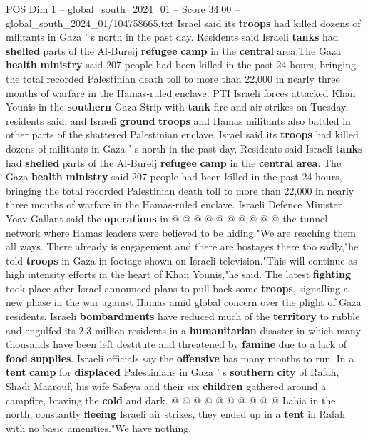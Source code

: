 \begin{textsample}{POS Dim 1 – global\_south\_2024\_01 – Score 34.00 – global\_south\_2024\_01/104758665.txt}  \label{ex:f1_pos_117}
Israel said its \textbf{troops} had killed dozens of militants in Gaza ' s north in the past day.
Residents said Israeli \textbf{tanks} had \textbf{shelled} parts of the Al-Bureij \textbf{refugee} \textbf{camp} in the \textbf{central} area.The Gaza \textbf{health} \textbf{ministry} said 207 people had been killed in the past 24 hours, bringing the total recorded Palestinian death toll to more than 22,000 in nearly three months of warfare in the Hamas-ruled enclave.
PTI Israeli forces attacked Khan Younis in the \textbf{southern} Gaza Strip with \textbf{tank} fire and air strikes on Tuesday, residents said, and Israeli \textbf{ground} \textbf{troops} and Hamas militants also battled in other parts of the shattered Palestinian enclave.
Israel said its \textbf{troops} had killed dozens of militants in Gaza ' s north in the past day.
Residents said Israeli \textbf{tanks} had \textbf{shelled} parts of the Al-Bureij \textbf{refugee} \textbf{camp} in the \textbf{central} \textbf{area}.
The Gaza \textbf{health} \textbf{ministry} said 207 people had been killed in the past 24 hours, bringing the total recorded Palestinian death toll to more than 22,000 in nearly three months of warfare in the Hamas-ruled enclave.
Israeli Defence Minister Yoav Gallant said the \textbf{operations} in @ @ @ @ @ @ @ @ @ @ the tunnel network where Hamas leaders were believed to be hiding."We are reaching them all ways.
There already is engagement and there are hostages there too sadly,"he told \textbf{troops} in Gaza in footage shown on Israeli television."This will continue as high intensity efforts in the heart of Khan Younis,"he said.
The latest \textbf{fighting} took place after Israel announced plans to pull back some \textbf{troops}, signalling a new phase in the war against Hamas amid global concern over the plight of Gaza residents.
Israeli \textbf{bombardments} have reduced much of the \textbf{territory} to rubble and engulfed its 2.3 million residents in a \textbf{humanitarian} disaster in which many thousands have been left destitute and threatened by \textbf{famine} due to a lack of \textbf{food} \textbf{supplies}.
Israeli officials say the \textbf{offensive} has many months to run.
In a \textbf{tent} \textbf{camp} for \textbf{displaced} Palestinians in Gaza ' s \textbf{southern} \textbf{city} of Rafah, Shadi Maarouf, his wife Safeya and their six \textbf{children} gathered around a campfire, braving the \textbf{cold} and dark. @ @ @ @ @ @ @ @ @ @ Lahia in the north, constantly \textbf{fleeing} Israeli air strikes, they ended up in a \textbf{tent} in Rafah with no basic amenities."We have nothing.

\end{textsample}
